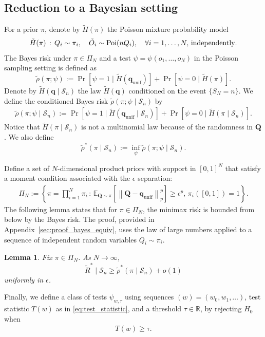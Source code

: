 \documentclass[11pt]{article}
\newtheorem{lem}[thm]{Lemma}
\numberwithin{equation}{section}
\newcommand{\unif}{\mathrm{unif}}
\newcommand{\Pois}{\mathrm{Poi}}
\newcommand{\Scal}{\mathcal{S}}
\newcommand{\Prp}[1]{\Pr\left[#1 \right]}
\newcommand{\reals}{\mathbb R}
\newcommand{\exsub}[2]{\ensuremath{\mathbb{E}_{#1}\left[ #2\right]}}
\begin{document}
\subsection{Reduction to a Bayesian setting}
For a prior $\pi$, denote by $\tilde{H}(\pi)$ the Poisson mixture probability model 
\begin{align*}
    \tilde{H}(\pi) \,:\,Q_i \sim \pi_i, \quad \tilde{O}_i \sim \Pois(n Q_i),\quad \forall i=1,\ldots,N,\,\mbox{\rmfamily independently}. 
\end{align*}
The Bayes risk under $\pi \in \Pi_{N}$ and a test $\psi = \psi(o_1,\ldots,o_N)$ in the Poisson sampling setting is defined as
\[
\tilde{\rho}(\pi; \psi) := \Prp{\psi = 1 \mid \tilde{H}(\mathbf{q}_{\unif})} + \Prp{\psi = 0 \mid \tilde{H}(\pi)}.
\]
Denote by $\tilde{H}(\mathbf{q} \mid \Scal_n)$ the law $\tilde{H}(\mathbf{q})$ conditioned on the event $\{S_N=n\}$. We define the conditioned Bayes risk $\tilde{\rho}(\pi; \psi \mid \Scal_n)$ by
\begin{align}
    \label{eq:rho_tilde_pi_cond_def}
    \tilde{\rho}(\pi; \psi \mid \Scal_n) :=  
    \Prp{\psi = 1 \mid \tilde{H}(\mathbf{q}_{\unif} \mid \Scal_n)} + \Prp{\psi = 0 \mid \tilde{H}(\pi \mid \Scal_n)}. 
\end{align}
Notice that $\tilde{H}(\pi \mid \Scal_n)$ is not a multinomial law because of the randomness in $\mathbf{Q}$. We also define 
\[
\tilde{\rho}^*(\pi \mid \Scal_n) := \inf_{\psi} \tilde{\rho}(\pi; \psi \mid \Scal_n).
\]

Define a set of $N$-dimensional product priors with support in $[0,1]^N$ that satisfy a moment condition associated with the $\epsilon$ separation:
\begin{align}
    \Pi_N := \left\{ \pi= \prod_{i=1}^N \pi_i \,:\, \exsub{\mathbf{Q} \sim \pi}{\left\|\mathbf{Q} - \mathbf{q}_{\unif} \right\|_p^p } \geq \epsilon^p,\, \pi_i([0,1])=1 \right\}.
\end{align}
The following lemma states that for $\pi \in \Pi_N$, the minimax risk is bounded from below by the Bayes risk. The proof, provided in Appendix~\ref{sec:proof_bayes_equiv}, uses the law of large numbers applied to a sequence of independent random variables $Q_i \sim \pi_i$.
\begin{lem}
\label{lem:Bayes_equivalence}
    Fix $\pi \in \Pi_N$. As $N \to \infty$, 
    \[
        \tilde{R}^* \mid \Scal_n \geq \tilde{\rho}^*(\pi \mid \Scal_n) + o(1)
    \]
    uniformly in $\epsilon$. 
\end{lem}

Finally, we define a class of tests $\psi_{w,\tau}$ using sequences $(w) = (w_0,w_1,\ldots)$, test statistic $T(w)$ as in \eqref{eq:test_statistic}, and a threshold $\tau \in \reals$, by rejecting $H_0$ when 
\begin{align}
\label{eq:linear_test}
    T(w) \geq \tau.
\end{align}
\end{document}
